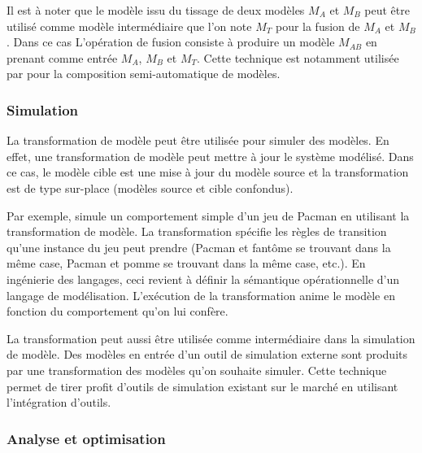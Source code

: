 Il est à noter que le modèle issu du tissage de deux modèles $M_{A}$ et $M_{B}$ 
peut être utilisé comme modèle intermédiaire que l'on note $M_{T}$ pour la 
fusion de $M_{A}$ et $M_{B}$. Dans ce cas L'opération de fusion consiste à 
produire un modèle $M_{AB}$ en prenant comme entrée $M_{A}$, $M_{B}$ et $M_{T}$. 
Cette technique est notamment utilisée par \cite{del2007semi} pour la 
composition semi-automatique de modèles.


\subsubsection{Simulation}

La transformation de modèle peut être utilisée pour simuler des modèles. En 
effet, une transformation de modèle peut mettre à jour le système modélisé. Dans 
ce cas, le modèle cible est une mise à jour du modèle source et la 
transformation est de type sur-place (modèles source et cible confondus). 

Par exemple, \cite{syriani2011multi} simule un comportement simple d'un jeu de 
Pacman en utilisant la transformation de modèle. La transformation spécifie les 
règles de transition qu'une instance du jeu peut prendre (Pacman et fantôme se 
trouvant dans la même case, Pacman et pomme se trouvant dans la même case, 
etc.). En ingénierie des langages, ceci revient à définir la sémantique 
opérationnelle d'un langage de modélisation. L'exécution de la transformation 
anime le modèle en fonction du comportement qu'on lui confère.

La transformation peut aussi être utilisée comme intermédiaire dans la 
simulation de modèle. Des modèles en entrée d'un outil de simulation externe 
sont produits par une transformation des modèles qu'on souhaite simuler. Cette 
technique permet de tirer profit d'outils de simulation existant sur le marché 
en utilisant l'intégration d'outils.

\subsubsection{Analyse et optimisation}


